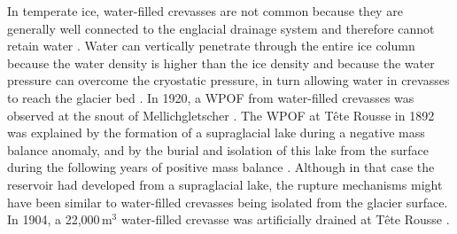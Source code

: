 In temperate ice, water-filled crevasses are not common because they are generally well connected to the englacial drainage system and therefore cannot retain water \citep{Fountain&Walder1998}. Water can vertically penetrate through the entire ice column \citep{Weertman1973,VanderVeen1998} because the water density is higher than the ice density and because the water pressure can overcome the cryostatic pressure, in turn allowing water in crevasses to reach the glacier bed \citep{VanderVeen2007,Benn&al2009}. In 1920, a WPOF from water-filled crevasses was observed at the snout of Mellichgletscher \citep{Mercanton1921}. The WPOF at Tête Rousse in 1892 was explained by the formation of a supraglacial lake during a negative mass balance anomaly, and by the burial and isolation of this lake from the surface during the following years of positive mass balance \citep{Vincent&al2010b}. Although in that case the reservoir had developed from a supraglacial lake, the rupture mechanisms might have been similar to water-filled crevasses being isolated from the glacier surface. In 1904, a 22,000\,m$^3$ water-filled crevasse was artificially drained at Tête Rousse \citep{Vincent&al2010b}.

